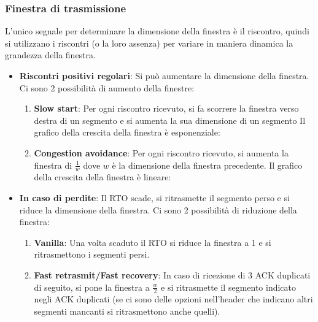 \documentclass[a4paper]{article}
\begin{document}
\subsubsection{Finestra di trasmissione}
L'unico segnale per determinare la dimensione della finestra è il riscontro, quindi
si utilizzano i riscontri (o la loro assenza) per variare in maniera dinamica la
grandezza della finestra. 
\label{06-11-D3}
\begin{itemize}
  \item \textbf{Riscontri positivi regolari}: Si può aumentare la dimensione della
    finestra. Ci sono 2 possibilità di aumento della finestre:
    \begin{enumerate}
      \item \textbf{Slow start}: Per ogni riscontro ricevuto, si fa scorrere la finestra
        verso destra di un segmento e si aumenta la sua dimensione di un segmento
        \label{06-11-D4}
        Il grafico della crescita della finestra è esponenziale:
        \label{06-11-D5}

      \item \textbf{Congestion avoidance}: Per ogni riscontro ricevuto, si aumenta
        la finestra di \( \frac{1}{w} \) dove \( w \) è la dimensione della finestra
        precedente.
        \label{06-11-D6}
        Il grafico della crescita della finestra è lineare:
        \label{06-11-D7}
    \end{enumerate}
  \item \textbf{In caso di perdite}: Il RTO scade, si ritrasmette il segmento perso
    e si riduce la dimensione della finestra. Ci sono 2 possibilità di riduzione della
    finestra:
    \begin{enumerate}
      \item \textbf{Vanilla}: Una volta scaduto il RTO si riduce la finestra a 1 e si 
        ritrasmettono i segmenti persi.

      \item \textbf{Fast retrasmit/Fast recovery}: In caso di ricezione di 3 ACK duplicati
        di seguito, si pone la finestra a \( \frac{w}{2} \) e si ritrasmette il segmento
        indicato negli ACK duplicati (se ci sono delle opzioni nell'header che indicano
        altri segmenti mancanti si ritrasmettono anche quelli).
        \label{06-11-D8}
    \end{enumerate}
\end{itemize}
\end{document}
